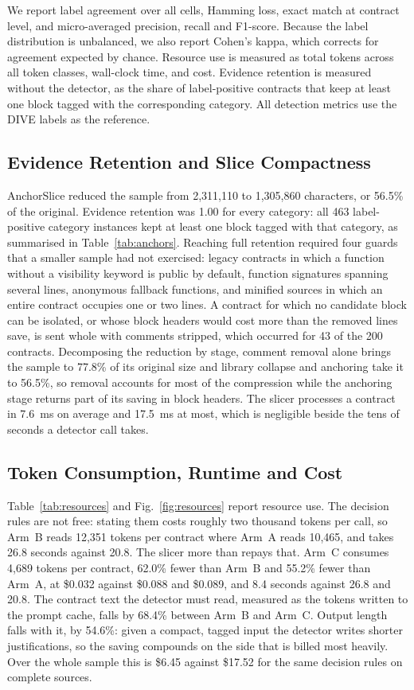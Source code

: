 \documentclass{ieeeaccess}
\begin{document}
We report label agreement over all cells, Hamming loss, exact match at contract level, and micro-averaged precision, recall and F1-score. Because the label distribution is unbalanced, we also report Cohen's kappa, which corrects for agreement expected by chance. Resource use is measured as total tokens across all token classes, wall-clock time, and cost. Evidence retention is measured without the detector, as the share of label-positive contracts that keep at least one block tagged with the corresponding category. All detection metrics use the DIVE labels as the reference.

\subsection{Evidence Retention and Slice Compactness}\label{subsec:retention}
AnchorSlice reduced the sample from 2,311,110 to 1,305,860 characters, or 56.5\% of the original. Evidence retention was 1.00 for every category: all 463 label-positive category instances kept at least one block tagged with that category, as summarised in Table~\ref{tab:anchors}. Reaching full retention required four guards that a smaller sample had not exercised: legacy contracts in which a function without a visibility keyword is public by default, function signatures spanning several lines, anonymous fallback functions, and minified sources in which an entire contract occupies one or two lines. A contract for which no candidate block can be isolated, or whose block headers would cost more than the removed lines save, is sent whole with comments stripped, which occurred for 43 of the 200 contracts. Decomposing the reduction by stage, comment removal alone brings the sample to 77.8\% of its original size and library collapse and anchoring take it to 56.5\%, so removal accounts for most of the compression while the anchoring stage returns part of its saving in block headers. The slicer processes a contract in 7.6~ms on average and 17.5~ms at most, which is negligible beside the tens of seconds a detector call takes.

\subsection{Token Consumption, Runtime and Cost}\label{subsec:cost}
Table~\ref{tab:resources} and Fig.~\ref{fig:resources} report resource use. The decision rules are not free: stating them costs roughly two thousand tokens per call, so Arm~B reads 12,351 tokens per contract where Arm~A reads 10,465, and takes 26.8 seconds against 20.8. The slicer more than repays that. Arm~C consumes 4,689 tokens per contract, 62.0\% fewer than Arm~B and 55.2\% fewer than Arm~A, at \$0.032 against \$0.088 and \$0.089, and 8.4 seconds against 26.8 and 20.8. The contract text the detector must read, measured as the tokens written to the prompt cache, falls by 68.4\% between Arm~B and Arm~C. Output length falls with it, by 54.6\%: given a compact, tagged input the detector writes shorter justifications, so the saving compounds on the side that is billed most heavily. Over the whole sample this is \$6.45 against \$17.52 for the same decision rules on complete sources.
\end{document}
